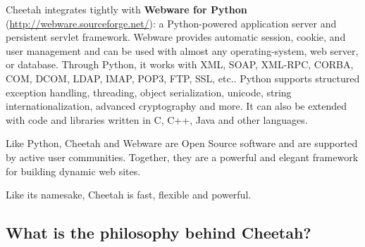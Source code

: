 Cheetah integrates tightly with {\bf Webware for Python}
(\url{http://webware.sourceforge.net/}): a Python-powered application server and
persistent servlet framework. Webware provides automatic session, cookie, and
user management and can be used with almost any operating-system, web server, or
database. Through Python, it works with XML, SOAP, XML-RPC, CORBA, COM, DCOM,
LDAP, IMAP, POP3, FTP, SSL, etc.. Python supports structured exception handling,
threading, object serialization, unicode, string internationalization, advanced
cryptography and more. It can also be extended with code and libraries written
in C, C++, Java and other languages.

Like Python, Cheetah and Webware are Open Source software and are supported by
active user communities.  Together, they are a powerful and elegant framework
for building dynamic web sites. 

Like its namesake, Cheetah is fast, flexible and powerful.



\subsection{What is the philosophy behind Cheetah?}
\label{intro.philosophy}

